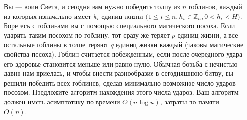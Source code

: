 \documentclass{article}
\begin{document}
Вы --- воин Света, и сегодня вам нужно победить толпу из $n$ гоблинов, каждый из которых изначально имеет
$h_i$ единиц жизни $(1 \leqslant i \leqslant n$,$\,h_i\in \mathbb{Z}_n$,$\,0 < h_i < H)$.
Боретесь с гоблинами вы с помощью специального магического посоха. Если ударить таким посохом по гоблину, тот сразу же теряет $p$ единиц жизни, а все остальные гоблины в толпе теряют $q$ единиц жизни каждый (таковы магические свойства посоха). Гоблин считается побежденным, если после очередного удара его здоровье становится меньше или равно
нулю. Обычная борьба с нечистью давно нам приелась, и чтобы внести разнообразие в сегодняшнюю битву, вы решили победить всех гоблинов, сделав минимально возможное число ударов посохом. Предложите
алгоритм нахождения этого числа ударов. Ваш алгоритм должен иметь асимптотику по времени $O(n \log n)$, затраты по памяти --- $O(n)$.
\end{document}
